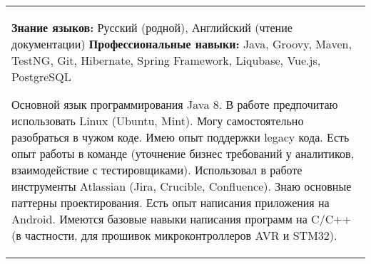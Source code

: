 \documentclass{article}
\begin{document}
\begin{table}[h!]
\begin{center}

\def\arraystretch{1.7}%

\begin{tabular}
{ L{18cm} } \hhline{|=|}

\textbf{Знание языков:} Русский (родной), Английский (чтение документации)\newline
\textbf{Профессиональные навыки:} Java, Groovy, Maven, TestNG, Git, Hibernate, Spring Framework, Liqubase, Vue.js, PostgreSQL\medskip

Основной язык программирования Java 8. В работе предпочитаю использовать Linux (Ubuntu, Mint). Могу самостоятельно разобраться в чужом коде. Имею опыт поддержки legacy кода. Есть опыт работы в команде (уточнение бизнес требований у аналитиков, взаимодействие с тестировщиками). Использовал в работе инструменты Atlassian (Jira, Crucible, Confluence). Знаю основные паттерны проектирования. Есть опыт написания приложения на Android. Имеются базовые навыки написания программ на C/C++ (в частности, для прошивок микроконтроллеров AVR и STM32).

\end{tabular}
\end{center}
\end{table}
\end{document}

